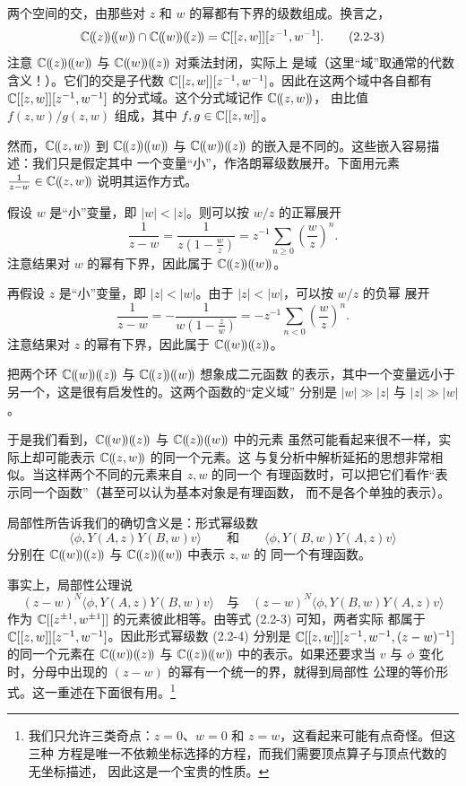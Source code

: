 两个空间的交，由那些对 $z$ 和 $w$ 的幂都有下界的级数组成。换言之，
\begin{equation}
    \C(\!(z)\!)(\!(w)\!)\cap\C(\!(w)\!)(\!(z)\!)
    =\C[[z,w]][z^{-1},w^{-1}].
    \tag{2.2-3}
\end{equation}
注意 $\mathbb{C}(\!(z)\!)(\!(w)\!)$ 与 $\mathbb{C}(\!(w)\!)(\!(z)\!)$ 对乘法封闭，实际上
是域（这里“域”取通常的代数含义！）。它们的交是子代数
$\mathbb{C}[[z,w]][z^{-1},w^{-1}]$。因此在这两个域中各自都有
$\mathbb{C}[[z,w]][z^{-1},w^{-1}]$ 的分式域。这个分式域记作 $\mathbb{C}(\!(z,w)\!)$，
由比值 $f(z,w)/g(z,w)$ 组成，其中 $f,g\in\mathbb{C}[[z,w]]$。

然而，$\mathbb{C}(\!(z,w)\!)$ 到 $\mathbb{C}(\!(z)\!)(\!(w)\!)$ 与
$\mathbb{C}(\!(w)\!)(\!(z)\!)$ 的嵌入是不同的。这些嵌入容易描述：我们只是假定其中
一个变量“小”，作洛朗幂级数展开。下面用元素 $\frac{1}{z-w}\in\mathbb{C}(\!(z,w)\!)$
说明其运作方式。

假设 $w$ 是“小”变量，即 $|w|<|z|$。则可以按 $w/z$ 的正幂展开
\[
    \frac{1}{z-w}=\frac{1}{z\left(1-\frac{w}{z}\right)}
    =z^{-1}\sum_{n\ge0}\left(\frac{w}{z}\right)^n.
\]
注意结果对 $w$ 的幂有下界，因此属于 $\mathbb{C}(\!(z)\!)(\!(w)\!)$。

再假设 $z$ 是“小”变量，即 $|z|<|w|$。由于 $|z|<|w|$，可以按 $w/z$ 的负幂
展开
\[
    \frac{1}{z-w}=-\frac{1}{w\left(1-\frac{z}{w}\right)}
    =-z^{-1}\sum_{n<0}\left(\frac{w}{z}\right)^n.
\]
注意结果对 $z$ 的幂有下界，因此属于 $\mathbb{C}(\!(w)\!)(\!(z)\!)$。

把两个环 $\mathbb{C}(\!(w)\!)(\!(z)\!)$ 与 $\mathbb{C}(\!(z)\!)(\!(w)\!)$ 想象成二元函数
的表示，其中一个变量远小于另一个，这是很有启发性的。这两个函数的“定义域”
分别是 $|w|\gg|z|$ 与 $|z|\gg|w|$。

于是我们看到，$\mathbb{C}(\!(w)\!)(\!(z)\!)$ 与 $\mathbb{C}(\!(z)\!)(\!(w)\!)$ 中的元素
虽然可能看起来很不一样，实际上却可能表示 $\mathbb{C}(\!(z,w)\!)$ 的同一个元素。这
与复分析中解析延拓的思想非常相似。当这样两个不同的元素来自 $z,w$ 的同一个
有理函数时，可以把它们看作“表示同一个函数”（甚至可以认为基本对象是有理函数，
而不是各个单独的表示）。

局部性所告诉我们的确切含义是：形式幂级数
\begin{equation}
    \langle\phi,Y(A,z)Y(B,w)v\rangle
    \qquad\text{和}\qquad
    \langle\phi,Y(B,w)Y(A,z)v\rangle
    \tag{2.2-4}
\end{equation}
分别在 $\mathbb{C}(\!(w)\!)(\!(z)\!)$ 与 $\mathbb{C}(\!(z)\!)(\!(w)\!)$ 中表示 $z,w$ 的
同一个有理函数。

事实上，局部性公理说
\[
    (z-w)^N\langle\phi,Y(A,z)Y(B,w)v\rangle
    \quad\text{与}\quad
    (z-w)^N\langle\phi,Y(B,w)Y(A,z)v\rangle
\]
作为 $\mathbb{C}[[z^{\pm1},w^{\pm1}]]$ 的元素彼此相等。由等式 (2.2-3) 可知，两者实际
都属于 $\mathbb{C}[[z,w]][z^{-1},w^{-1}]$。因此形式幂级数 (2.2-4) 分别是
$\mathbb{C}[[z,w]][z^{-1},w^{-1},(z-w)^{-1}]$ 的同一个元素在
$\mathbb{C}(\!(w)\!)(\!(z)\!)$ 与 $\mathbb{C}(\!(z)\!)(\!(w)\!)$ 中的表示。如果还要求当
$v$ 与 $\phi$ 变化时，分母中出现的 $(z-w)$ 的幂有一个统一的界，就得到局部性
公理的等价形式。这一重述在下面很有用。\footnote{%
我们只允许三类奇点：$z=0$、$w=0$ 和 $z=w$，这看起来可能有点奇怪。但这三种
方程是唯一不依赖坐标选择的方程，而我们需要顶点算子与顶点代数的无坐标描述，
因此这是一个宝贵的性质。}

